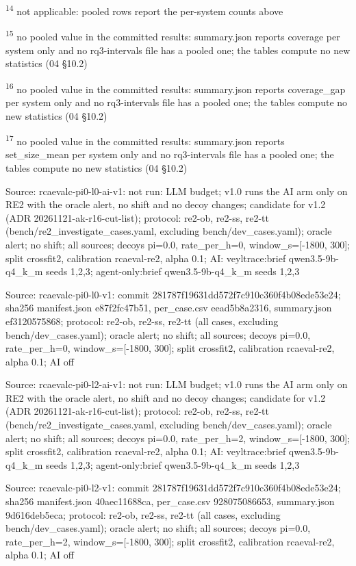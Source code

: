 \textsuperscript{14} not applicable: pooled rows report the per-system counts above\par
\textsuperscript{15} no pooled value in the committed results: summary.json reports coverage per system only and no rq3-intervals file has a pooled one; the tables compute no new statistics (04 \S{}10.2)\par
\textsuperscript{16} no pooled value in the committed results: summary.json reports coverage\_gap per system only and no rq3-intervals file has a pooled one; the tables compute no new statistics (04 \S{}10.2)\par
\textsuperscript{17} no pooled value in the committed results: summary.json reports set\_size\_mean per system only and no rq3-intervals file has a pooled one; the tables compute no new statistics (04 \S{}10.2)\par
\noindent Source: rcaevalc-pi0-l0-ai-v1: not run: LLM budget; v1.0 runs the AI arm only on RE2 with the oracle alert, no shift and no decoy changes; candidate for v1.2 (ADR 20261121-ak-r16-cut-list); protocol: re2-ob, re2-ss, re2-tt (bench/\allowbreak{}re2\_investigate\_cases.yaml, excluding bench/\allowbreak{}dev\_cases.yaml); oracle alert; no shift; all sources; decoys pi=0.0, rate\_per\_h=0, window\_s=[-1800, 300]; split crossfit2, calibration rcaeval-re2, alpha 0.1; AI: veyltrace:brief qwen3.5-9b-q4\_k\_m seeds 1,2,3; agent-only:brief qwen3.5-9b-q4\_k\_m seeds 1,2,3\par
\noindent Source: rcaevalc-pi0-l0-v1: commit 281787f19631dd572f7c910c360f4b08ede53e24; sha256 manifest.json e87f2fc47b51, per\_case.csv eead5b8a2316, summary.json ef3120575868; protocol: re2-ob, re2-ss, re2-tt (all cases, excluding bench/\allowbreak{}dev\_cases.yaml); oracle alert; no shift; all sources; decoys pi=0.0, rate\_per\_h=0, window\_s=[-1800, 300]; split crossfit2, calibration rcaeval-re2, alpha 0.1; AI off\par
\noindent Source: rcaevalc-pi0-l2-ai-v1: not run: LLM budget; v1.0 runs the AI arm only on RE2 with the oracle alert, no shift and no decoy changes; candidate for v1.2 (ADR 20261121-ak-r16-cut-list); protocol: re2-ob, re2-ss, re2-tt (bench/\allowbreak{}re2\_investigate\_cases.yaml, excluding bench/\allowbreak{}dev\_cases.yaml); oracle alert; no shift; all sources; decoys pi=0.0, rate\_per\_h=2, window\_s=[-1800, 300]; split crossfit2, calibration rcaeval-re2, alpha 0.1; AI: veyltrace:brief qwen3.5-9b-q4\_k\_m seeds 1,2,3; agent-only:brief qwen3.5-9b-q4\_k\_m seeds 1,2,3\par
\noindent Source: rcaevalc-pi0-l2-v1: commit 281787f19631dd572f7c910c360f4b08ede53e24; sha256 manifest.json 40aec11688ca, per\_case.csv 928075086653, summary.json 9d616deb5eca; protocol: re2-ob, re2-ss, re2-tt (all cases, excluding bench/\allowbreak{}dev\_cases.yaml); oracle alert; no shift; all sources; decoys pi=0.0, rate\_per\_h=2, window\_s=[-1800, 300]; split crossfit2, calibration rcaeval-re2, alpha 0.1; AI off\par
